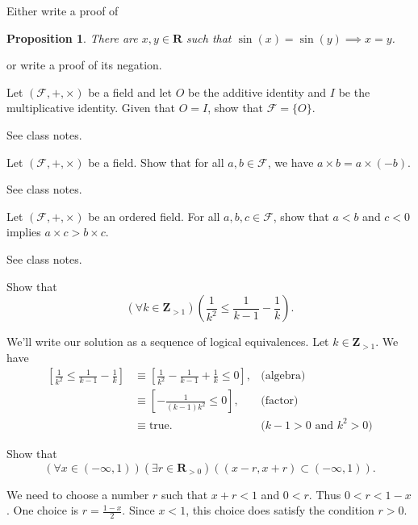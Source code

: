 \documentclass[12pt,fleqn,answers]{exam}
\newtheorem{prop}{Proposition}
\newcommand{\reals}{\mathbf{R}}
\newcommand{\integers}{\mathbf{Z}}
\newcommand{\true}{\mbox{true}}
\begin{document}
\begin{questions}
\question Either write a proof of 
     \begin{prop} There are $x,y \in \reals$ such that  $\sin(x) = \sin(y) \implies x = y$. 
     \end{prop} 
or write a proof of its negation.

\question Let $(\mathcal{F},+, \times)$ be a field and let $O$ be the additive identity and $I$ be the multiplicative
identity. Given that $O = I$, show that $\mathcal{F} = \{O\}$.

\begin{solution}  See class notes.

\end{solution}

\question Let $(\mathcal{F},+, \times)$ be a field. Show that for all $a,b \in \mathcal{F}$, we have $a \times b = a \times (-b)$.

\begin{solution}  See class notes.

\end{solution}
\question Let $(\mathcal{F},+, \times)$ be an ordered  field. For all $a,b,c \in \mathcal{F}$, show that $a < b$ and $c < 0$
implies $a \times c > b \times c$.
\begin{solution}  See class notes.

\end{solution}

\question Show that 
\[
    \left(\forall k \in \integers_{>1} \right) 
      \left(\frac{1}{k^2} \leq \frac{1}{k-1} - \frac{1}{k} \right).
\]

\begin{solution}
  We'll write our solution as a sequence of logical equivalences. Let $k \in 
  \integers_{>1}$. We have
  \begin{align*}
    \left[\frac{1}{k^2} \leq \frac{1}{k-1} - \frac{1}{k} \right] &\equiv
    \left[\frac{1}{k^2} - \frac{1}{k-1} + \frac{1}{k}  \leq 0 \right], &\mbox{(algebra)} \\
    &\equiv \left[ -\frac{1}{(k-1) k^2}  \leq 0 \right], &\mbox{(factor)} \\
    &\equiv \true. &\mbox{($k - 1 > 0$ and $k^2 > 0$)}
  \end{align*}
  
\end{solution}
\question Show that
\[
    \left(\forall x \in (-\infty, 1) \right)\left( \exists r \in \reals_{>0} \right)
    \left((x-r,x+r) \subset (-\infty, 1) \right).
\]

\begin{solution}
  We need to choose a number $r$ such that $x+r < 1$ and $0 < r$. 
  Thus $0 < r < 1-x$. One choice is $r = \frac{1-x}{2}$. Since $x < 1$,
  this choice does satisfy the condition $r > 0$.


\end{solution}
\end{questions}
\end{document}
